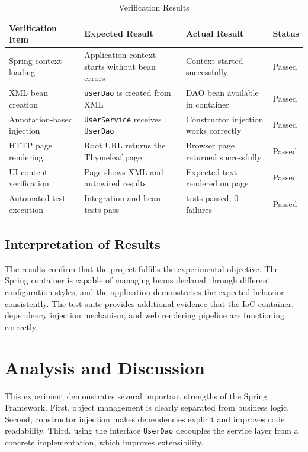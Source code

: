 \documentclass[12pt,a4paper]{article}
\begin{document}
\begin{table}[H]
    \centering
    \caption{Verification Results}
    \label{tab:verification}
    \begin{tabular}{>{\raggedright\arraybackslash}p{4.2cm} >{\raggedright\arraybackslash}p{4.6cm} >{\raggedright\arraybackslash}p{3.4cm} >{\raggedright\arraybackslash}p{2cm}}
        \toprule
        Verification Item & Expected Result & Actual Result & Status \\
        \midrule
        Spring context loading & Application context starts without bean errors & Context started successfully & Passed \\
        XML bean creation & \texttt{userDao} is created from XML & DAO bean available in container & Passed \\
        Annotation-based injection & \texttt{UserService} receives \texttt{UserDao} & Constructor injection works correctly & Passed \\
        HTTP page rendering & Root URL returns the Thymeleaf page & Browser page returned successfully & Passed \\
        UI content verification & Page shows XML and autowired results & Expected text rendered on page & Passed \\
        Automated test execution & Integration and bean tests pass & 2 tests passed, 0 failures & Passed \\
        \bottomrule
    \end{tabular}
\end{table}

\subsection{Interpretation of Results}
The results confirm that the project fulfills the experimental objective. The Spring container is capable of managing beans declared through different configuration styles, and the application demonstrates the expected behavior consistently. The test suite provides additional evidence that the IoC container, dependency injection mechanism, and web rendering pipeline are functioning correctly.

\section{Analysis and Discussion}
This experiment demonstrates several important strengths of the Spring Framework. First, object management is clearly separated from business logic. Second, constructor injection makes dependencies explicit and improves code readability. Third, using the interface \texttt{UserDao} decouples the service layer from a concrete implementation, which improves extensibility.
\end{document}

